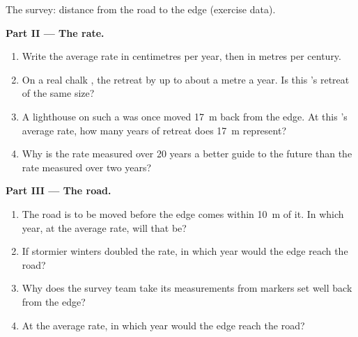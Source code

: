 \begin{problem}
\begin{omfigure}
{\small The survey: distance from the  road to the  edge (exercise
data).}
\label{fig:g9:landforms:survey}
\end{omfigure}

\noindent\textbf{Part II --- The rate.}\par\nopagebreak
\begin{enumerate}[resume, beginpenalty=10000]
  \item Write the average rate in centimetres per year, then in metres per
        century.
  \item On a real chalk , the  retreat by up to about a metre a
        year. Is this 's retreat of the same size?
  \item A lighthouse on such a  was once moved \qty{17}{m} back from
        the edge. At this 's average rate, how many years of retreat
        does \qty{17}{m} represent?
  \item Why is the rate measured over 20 years a better guide to the
        future than the rate measured over two years?
\end{enumerate}

\noindent\textbf{Part III --- The road.}\par\nopagebreak
\begin{enumerate}[resume, beginpenalty=10000]
  \item The road is to be moved before the edge comes within \qty{10}{m} of
        it. In which year, at the average rate, will that be?
  \item If stormier winters doubled the rate, in which year would the edge
        reach the road?
  \item Why does the survey team take its measurements from markers set
        well back from the edge?
  \item At the average rate, in which year would the  edge reach the
        road?
\end{enumerate}
\end{problem}
